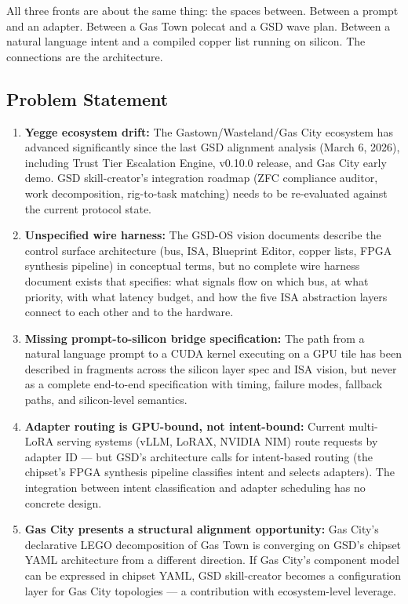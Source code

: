 \documentclass[11pt,letterpaper]{article}
\begin{document}
All three fronts are about the same thing: the spaces between. Between a prompt and an adapter. Between a Gas Town polecat and a GSD wave plan. Between a natural language intent and a compiled copper list running on silicon. The connections are the architecture.

\subsection{Problem Statement}

\begin{enumerate}
  \item \textbf{Yegge ecosystem drift:} The Gastown/Wasteland/Gas City ecosystem has advanced significantly since the last GSD alignment analysis (March 6, 2026), including Trust Tier Escalation Engine, v0.10.0 release, and Gas City early demo. GSD skill-creator's integration roadmap (ZFC compliance auditor, work decomposition, rig-to-task matching) needs to be re-evaluated against the current protocol state.
  
  \item \textbf{Unspecified wire harness:} The GSD-OS vision documents describe the control surface architecture (bus, ISA, Blueprint Editor, copper lists, FPGA synthesis pipeline) in conceptual terms, but no complete wire harness document exists that specifies: what signals flow on which bus, at what priority, with what latency budget, and how the five ISA abstraction layers connect to each other and to the hardware.
  
  \item \textbf{Missing prompt-to-silicon bridge specification:} The path from a natural language prompt to a CUDA kernel executing on a GPU tile has been described in fragments across the silicon layer spec and ISA vision, but never as a complete end-to-end specification with timing, failure modes, fallback paths, and silicon-level semantics.
  
  \item \textbf{Adapter routing is GPU-bound, not intent-bound:} Current multi-LoRA serving systems (vLLM, LoRAX, NVIDIA NIM) route requests by adapter ID --- but GSD's architecture calls for intent-based routing (the chipset's FPGA synthesis pipeline classifies intent and selects adapters). The integration between intent classification and adapter scheduling has no concrete design.
  
  \item \textbf{Gas City presents a structural alignment opportunity:} Gas City's declarative LEGO decomposition of Gas Town is converging on GSD's chipset YAML architecture from a different direction. If Gas City's component model can be expressed in chipset YAML, GSD skill-creator becomes a configuration layer for Gas City topologies --- a contribution with ecosystem-level leverage.
\end{enumerate}
\end{document}

